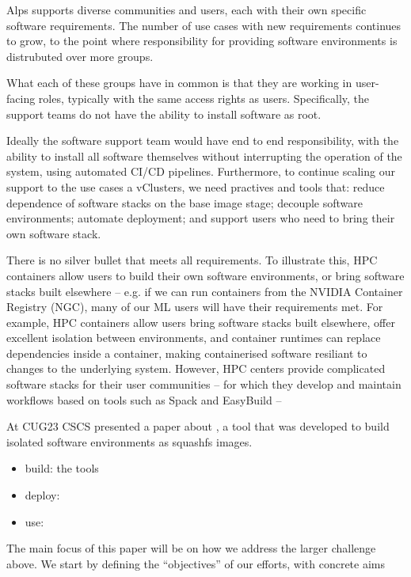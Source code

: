 Alps supports diverse communities and users, each with their own specific software requirements.
The number of use cases with new requirements continues to grow, to the point where responsibility for providing software environments is distrubuted over more groups.

What each of these groups have in common is that they are working in user-facing roles, typically with the same access rights as users. Specifically, the support teams do not have the ability to install software as root.

Ideally the software support team would have end to end responsibility, with the ability to install all software themselves without interrupting the operation of the system, using automated CI/CD pipelines.
Furthermore, to continue scaling our support to the use cases a vClusters, we need practives and tools that: reduce dependence of software stacks on the base image stage; decouple software environments; automate deployment; and support users who need to bring their own software stack.

There is no silver bullet that meets all requirements.
To illustrate this, HPC containers allow users to build their own software environments, or bring software stacks built elsewhere -- e.g. if we can run containers from the NVIDIA Container Registry (NGC), many of our ML users will have their requirements met.
For example, HPC containers allow users bring software stacks built elsewhere, offer excellent isolation between environments, and container runtimes can replace dependencies inside a container, making containerised software resiliant to changes to the underlying system.
However, HPC centers provide complicated software stacks for their user communities -- for which they develop and maintain workflows based on tools such as Spack and EasyBuild -- 

At CUG23 CSCS presented a paper about \stackinator, a tool that was developed to build isolated software environments as squashfs images.

\begin{itemize}
    \item build: the tools
    \item deploy:
    \item use: 
\end{itemize}

The main focus of this paper will be on how we address the larger challenge above.
We start by defining the ``objectives'' of our efforts, with concrete aims 

